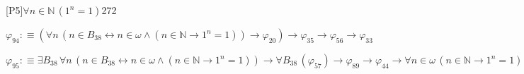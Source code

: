 \begin{fullproof}{[P5]}{$\forall n \in \mathbb{N}\,({{1}^{n}} = 1)$}{272}
\begin{abbrevlist}
\item $\varphi_{94} :\equiv (\forall n\,(n \in B_{38} \leftrightarrow n \in \omega \land (n \in \mathbb{N} \to {{1}^{n}} = 1)) \to \varphi_{20}) \to \varphi_{35} \to \varphi_{56} \to \varphi_{33}$
\item $\varphi_{95} :\equiv \exists B_{38}\,\forall n\,(n \in B_{38} \leftrightarrow n \in \omega \land (n \in \mathbb{N} \to {{1}^{n}} = 1)) \to \forall B_{38}\,(\varphi_{57}) \to \varphi_{89} \to \varphi_{44} \to \forall n \in \omega\,(n \in \mathbb{N} \to {{1}^{n}} = 1)$
\end{abbrevlist}
\end{fullproof}
